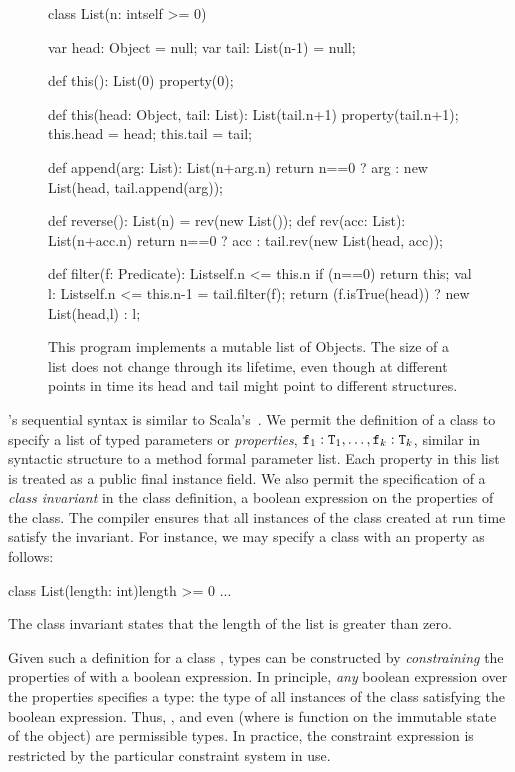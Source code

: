 \begin{figure}[t]
{
\footnotesize
\begin{xtenlines}
class List(n: int{self >= 0}) {
  var head: Object = null;
  var tail: List(n-1) = null;

  def this(): List(0) { property(0); }

  def this(head: Object, tail: List): List(tail.n+1) {
    property(tail.n+1);
    this.head = head;
    this.tail = tail;
  }

  def append(arg: List): List(n+arg.n) {
    return n==0
      ? arg : new List(head, tail.append(arg));
  }

  def reverse(): List(n) = rev(new List());
  def rev(acc: List): List(n+acc.n) {
    return n==0
      ? acc : tail.rev(new List(head, acc));
  }

  def filter(f: Predicate): List{self.n <= this.n} {
    if (n==0) return this;
    val l: List{self.n <= this.n-1} = tail.filter(f);
    return (f.isTrue(head)) ? new List(head,l) : l;
  }
}
\end{xtenlines}
}
\caption{
This program implements a mutable list of Objects. The size of a list
does not change through its lifetime, even though at different points
in time its head and tail might point to different structures.}
\label{fig:list-example}
\end{figure}

\Xten's sequential syntax is similar to Scala's~\cite{scala}.
We permit the definition of a class  to specify
a list of typed parameters or {\em properties},
${\tt f}_1: {\tt T}_1, \dots, {\tt f}_k: {\tt T}_k$,
similar in syntactic structure to a method formal parameter list.
%
Each property in this list is treated as a public final instance field.
%
We also permit the
specification of a {\em class invariant}
in the class definition,
a boolean expression on the properties of the class.
The compiler ensures that all
instances of the class created at run time satisfy the invariant.
%
For instance, we may specify a class  with an
  property as follows:
\begin{xtennoindent}
  class List(length: int){length >= 0} {...}
\end{xtennoindent}
The class invariant states that the length of the list
is greater than zero.

Given such a definition for a class , types
can be
constructed by {\em constraining} the properties of  with
a boolean expression.  In
principle, {\em any} boolean expression over the properties
specifies a type: the type of all instances of the class
satisfying the boolean expression. Thus, ,
 and
even  (where  
is function on the immutable state of the  object)
are permissible types.
In practice, the constraint expression is restricted by the
particular constraint system in use.

